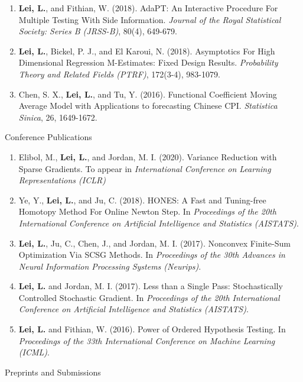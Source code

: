 \documentclass{article}
\begin{document}
\begin{enumerate}
\item \textbf{Lei, L.}, and Fithian, W. (2018). AdaPT: An Interactive Procedure For Multiple Testing With Side Information. \emph{Journal of the Royal Statistical Society: Series B (JRSS-B)}, 80(4), 649-679.
\item \textbf{Lei, L.}, Bickel, P. J., and El Karoui, N. (2018). Asymptotics For High Dimensional Regression M-Estimates: Fixed Design Results. \emph{Probability Theory and Related Fields (PTRF)}, 172(3-4), 983-1079.
\item Chen, S. X., \textbf{Lei, L.}, and Tu, Y. (2016). Functional Coefficient Moving Average Model with Applications to forecasting Chinese CPI. \emph{Statistica Sinica}, 26, 1649-1672.
\end{enumerate}

\begin{large}
\noindent Conference Publications
\end{large}

\begin{enumerate}
\item Elibol, M., \textbf{Lei, L.}, and Jordan, M. I. (2020). Variance Reduction with Sparse Gradients. To appear in \emph{International Conference on Learning Representations (ICLR)}
\item Ye, Y., \textbf{Lei, L.}, and Ju, C. (2018). HONES: A Fast and Tuning-free Homotopy Method For Online Newton Step. In \emph{Proceedings of the 20th International Conference on Artificial Intelligence and Statistics (AISTATS)}.
\item \textbf{Lei, L.}, Ju, C., Chen, J., and Jordan, M. I. (2017). Nonconvex Finite-Sum Optimization Via SCSG Methods. In \emph{Proceedings of the 30th Advances in Neural Information Processing Systems (Neurips)}.
\item \textbf{Lei, L.} and Jordan, M. I. (2017). Less than a Single Pass: Stochastically Controlled Stochastic Gradient. In \emph{Proceedings of the 20th International Conference on Artificial Intelligence and Statistics (AISTATS)}.
\item \textbf{Lei, L.} and Fithian, W. (2016). Power of Ordered Hypothesis Testing. In \emph{Proceedings of the 33th International Conference on Machine Learning (ICML)}.
\end{enumerate}

\begin{large}
\noindent Preprints and Submissions
\end{large}
\end{document}

